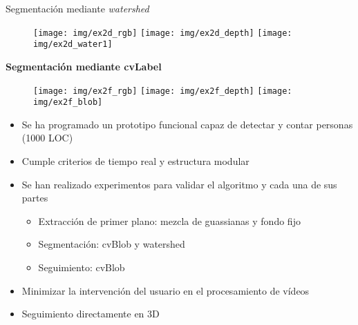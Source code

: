 \documentclass[notes,slidesec,a4]{seminar}
\begin{document}

\begin{hslide}
Segmentación mediante \textit{watershed}
\begin{center}
\begin{figure}
	\texttt{[image: img/ex2d\_rgb]}
	\texttt{[image: img/ex2d\_depth]}
	\texttt{[image: img/ex2d\_water1]}
\end{figure}
\end{center}
\textbf{Segmentación mediante cvLabel}
\begin{center}
\begin{figure}
	\texttt{[image: img/ex2f\_rgb]}
	\texttt{[image: img/ex2f\_depth]}
	\texttt{[image: img/ex2f\_blob]}
\end{figure}
\end{center}
\end{hslide}


\begin{hslide}
\begin{itemize}
\item Se ha programado un prototipo funcional capaz de detectar y contar personas (1000 LOC)
\item Cumple criterios de tiempo real y estructura modular
\item Se han realizado experimentos para validar el algoritmo y cada una de sus partes
\begin{itemize}
\item Extracción de primer plano: mezcla de guassianas y fondo fijo
\item Segmentación: cvBlob y watershed
\item Seguimiento: cvBlob
\end{itemize}
\end{itemize}
\end{hslide}


\begin{hslide}
\begin{itemize}
\item Minimizar la intervención del usuario en el procesamiento de vídeos
\item Seguimiento directamente en 3D
\end{itemize}
\end{hslide}

\end{document}
